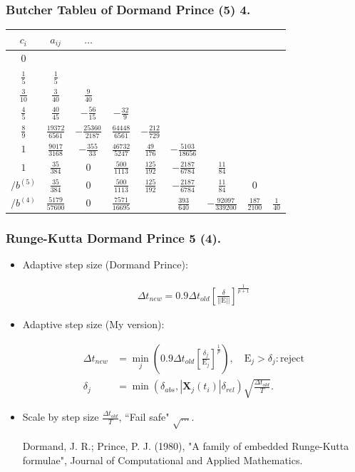 \documentclass{beamer}
\begin{document}
\begin{frame}
\frametitle{Butcher Tableu of Dormand Prince (5) 4.}

{\renewcommand{\arraystretch}{1.2}
\begin{tabular}{c | @{\quad} c @{\quad} c @{\quad} c @{\quad} c @{\quad} c @{\quad} c @{\quad} c @{\quad} c}
$c_i$ & $a_{ij}$ & $\hdots$\\
\midrule
$0$ \\
$\frac{1}{5}$ & $\frac{1}{5}$\\
$\frac{3}{10}$ & $\frac{3}{40}$ &  $\frac{9}{40}$\\
$\frac{4}{5}$ & $\frac{40}{45}$ &  $-\frac{56}{15}$  &  $-\frac{32}{9}$\\
$\frac{8}{9}$ & $\frac{19372}{6561}$ & $-\frac{25360}{2187}$ & $\frac{64448}{6561}$ & $-\frac{212}{729}$\\
$1$ & $\frac{9017}{3168}$ & $-\frac{355}{33}$ & $\frac{46732}{5247}$ & $\frac{49}{176}$  & $-\frac{5103}{18656}$\\
$1$ & $\frac{35}{384}$  & $0$	 & $\frac{500}{1113}$ & $\frac{125}{192}$ & $-\frac{2187}{6784}$ & $\frac{11}{84}$\\
\midrule
$/b^{(5)}$  & $\frac{35}{384}$ & $0$ & $\frac{500}{1113}$ & $\frac{125}{192}$ & $-\frac{2187}{6784}$ & $\frac{11}{84}$ & $0$\\
$/b^{(4)}$ & $\frac{5179}{57600}$ & $0$ & $\frac{7571}{16695}$ & & $\frac{393}{640}$ & $-\frac{92097}{339200}$& $\frac{187}{2100}$ & $\frac{1}{40}$
\end{tabular}
}
\end{frame}

\begin{frame}
\frametitle{Runge-Kutta Dormand Prince 5 (4).}

\begin{itemize}
\item <1-> Adaptive step size (Dormand Prince):

\begin{align*}
 \Delta t_{new}  = 0.9  \Delta t_{old}  \left[\frac{\delta }{||\mathrm{E}||}\right]^{\frac{1}{p+1}}
\end{align*}

\item <2-> Adaptive step size (My version):

\begin{align*}
 \Delta t_{new}  &= \min_j \left(0.9  \Delta t_{old}  \left[\frac{\delta_j}{\mathrm{E}_{j}}\right]^{\frac{1}{p}}\right), \quad \mathrm{E}_j>\delta_j : \mathrm{reject}\\
\delta_j &=\min(\delta_{abs},|\mathbf{X}_j(t_{i})|\delta_{rel})\sqrt{\frac{ \Delta t_{old} }{T}}.
\end{align*}

\item <3-> Scale by step size $\frac{ \Delta t_{old} }{T}$, ``Fail safe" $\sqrt{\ldots}$.

{\color{gray} Dormand, J. R.; Prince, P. J. (1980), "A family of embedded Runge-Kutta formulae", Journal of Computational and Applied Mathematics.}
\end{itemize}
\end{frame}
\end{document}
